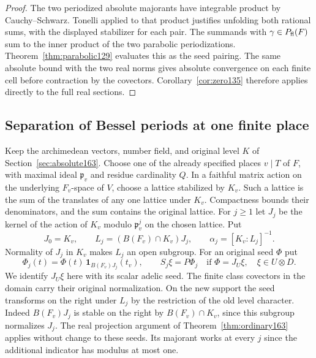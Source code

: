 \documentclass[a4paper,11pt]{article}
\theoremstyle{definition}
\theoremstyle{remark}
\numberwithin{equation}{section}
\begin{document}
\begin{proof}
The two periodized absolute majorants have integrable product
by Cauchy--Schwarz. Tonelli applied to that product justifies
unfolding both rational sums, with the displayed stabilizer for
each pair. The summands with \(\gamma\in P_{\rm fl}(F)\)
sum to the inner product of the two parabolic periodizations.
Theorem~\ref{thm:parabolic129} evaluates this as the seed pairing.
The same absolute bound with the two real norms gives absolute
convergence on each finite cell before contraction by the
covectors. Corollary~\ref{cor:zero135} therefore applies
directly to the full real sections.
\end{proof}

\subsection{Separation of Bessel periods at one finite place}\label{nav:VII-12}
\label{sec:depth163}

Keep the archimedean vectors, number field, and original level
\(K\) of Section~\ref{sec:absolute163}. Choose one of the already
specified places \(v\mid T\) of \(F\), with maximal ideal
\(\mathfrak p_v\) and residue cardinality \(Q\). In a faithful
matrix action on the underlying \(F_v\)-space of \(V\), choose
a lattice stabilized by \(K_v\). Such a lattice is the sum of
the translates of any one lattice under \(K_v\). Compactness
bounds their denominators, and the sum contains the original
lattice. For \(j\ge1\) let \(J_j\) be the kernel of the action
of \(K_v\) modulo \(\mathfrak p_v^j\) on the chosen lattice.
Put
\[
 J_0=K_v,\qquad L_j=(B(F_v)\cap K_v)J_j,\qquad
 \alpha_j=[K_v:L_j]^{-1}.
\]
Normality of \(J_j\) in \(K_v\) makes \(L_j\) an open subgroup.
For an original seed \(\Phi\) put
\[
  \Phi_j(t)=\Phi(t)\,\mathbf1_{B(F_v)J_j}(t_v),\qquad
  S_j\xi=P\Phi_j\quad\text{if }\Phi=J_U\xi,\quad
  \xi\in U\otimes D .
\]
We identify \(J_U\xi\) here with its scalar adelic seed.
The finite class covectors in the domain carry their original
normalization. On the new support the seed transforms on the
right under \(L_j\) by the restriction of the old level
character. Indeed \(B(F_v)J_j\) is stable on the right by
\(B(F_v)\cap K_v\), since this subgroup normalizes \(J_j\).
The real projection argument of Theorem~\ref{thm:ordinary163}
applies without change to these seeds. Its majorant works at
every \(j\) since the additional indicator has modulus at most one.
\end{document}
